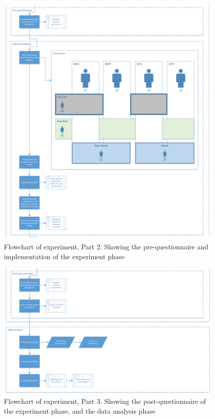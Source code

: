 \documentclass{sig-alternate-05-2015}
\begin{document}
\begin{figure}[!ht]
	\centering
	\includegraphics[width=2.13\linewidth]{flow02}
	\caption{Flowchart of experiment, Part 2. Showing the pre-questionnaire and implementation of the experiment phase}
	\label{fig:Flowchart2}
\end{figure}
\clearpage

\begin{figure}[!ht]
	\centering
	\includegraphics[width=2.13\linewidth]{flow03}
	\caption{Flowchart of experiment, Part 3. Showing the post-questionnaire of the experiment phase, and the data analysis phase}
	\label{fig:Flowchart3}
\end{figure}
\end{document}
